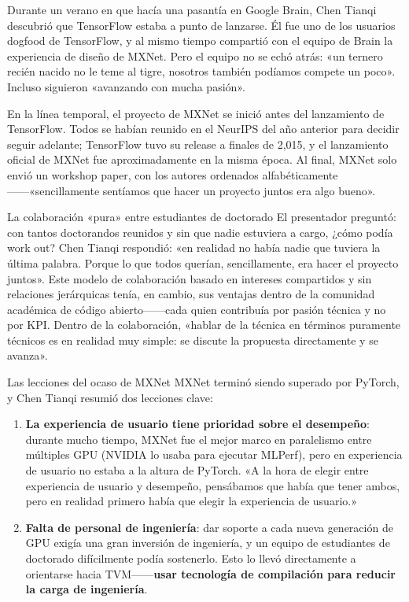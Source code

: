 Durante un verano en que hacía una pasantía en Google Brain, Chen Tianqi descubrió que TensorFlow estaba a punto de lanzarse. Él fue uno de los usuarios dogfood de TensorFlow, y al mismo tiempo compartió con el equipo de Brain la experiencia de diseño de MXNet. Pero el equipo no se echó atrás: «un ternero recién nacido no le teme al tigre, nosotros también podíamos compete un poco». Incluso siguieron «avanzando con mucha pasión».

En la línea temporal, el proyecto de MXNet se inició antes del lanzamiento de TensorFlow. Todos se habían reunido en el NeurIPS del año anterior para decidir seguir adelante; TensorFlow tuvo su release a finales de 2,015, y el lanzamiento oficial de MXNet fue aproximadamente en la misma época. Al final, MXNet solo envió un workshop paper, con los autores ordenados alfabéticamente------«sencillamente sentíamos que hacer un proyecto juntos era algo bueno».

\begin{knowledgebox}{La colaboración «pura» entre estudiantes de doctorado}
El presentador preguntó: con tantos doctorandos reunidos y sin que nadie estuviera a cargo, ¿cómo podía work out? Chen Tianqi respondió: «en realidad no había nadie que tuviera la última palabra. Porque lo que todos querían, sencillamente, era hacer el proyecto juntos». Este modelo de colaboración basado en intereses compartidos y sin relaciones jerárquicas tenía, en cambio, sus ventajas dentro de la comunidad académica de código abierto------cada quien contribuía por pasión técnica y no por KPI. Dentro de la colaboración, «hablar de la técnica en términos puramente técnicos es en realidad muy simple: se discute la propuesta directamente y se avanza».
\end{knowledgebox}

\begin{warningbox}{Las lecciones del ocaso de MXNet}
MXNet terminó siendo superado por PyTorch, y Chen Tianqi resumió dos lecciones clave:
\begin{enumerate}
    \item \textbf{La experiencia de usuario tiene prioridad sobre el desempeño}: durante mucho tiempo, MXNet fue el mejor marco en paralelismo entre múltiples GPU (NVIDIA lo usaba para ejecutar MLPerf), pero en experiencia de usuario no estaba a la altura de PyTorch. «A la hora de elegir entre experiencia de usuario y desempeño, pensábamos que había que tener ambos, pero en realidad primero había que elegir la experiencia de usuario.»
    \item \textbf{Falta de personal de ingeniería}: dar soporte a cada nueva generación de GPU exigía una gran inversión de ingeniería, y un equipo de estudiantes de doctorado difícilmente podía sostenerlo. Esto lo llevó directamente a orientarse hacia TVM------\textbf{usar tecnología de compilación para reducir la carga de ingeniería}.
\end{enumerate}
\end{warningbox}

